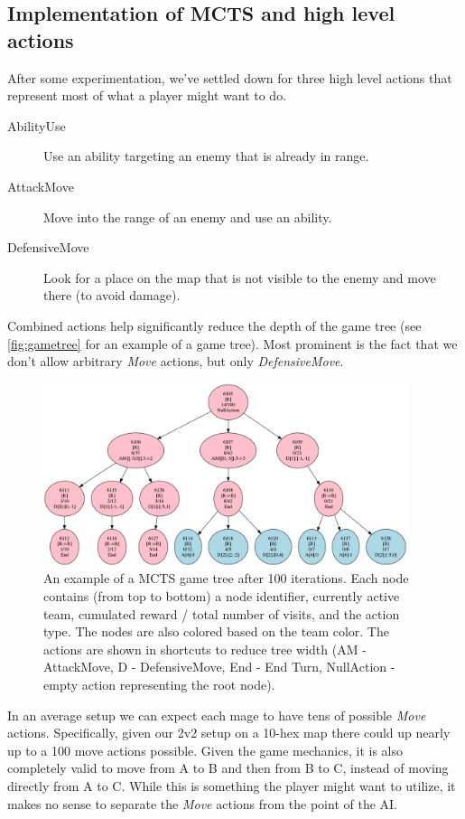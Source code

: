 \subsection{Implementation of MCTS and high level actions}

After some experimentation, we've settled down for three high level actions
that represent most of what a player might want to do.

\begin{description}
\item [AbilityUse] Use an ability targeting an enemy that is already in range.
\item [AttackMove] Move into the range of an enemy and use an ability.
\item [DefensiveMove] Look for a place on the map that is not visible to the enemy and move there (to avoid damage).
\end{description}

Combined actions help significantly reduce the depth of the game tree (see \autoref{fig:gametree} for an example of a game tree). Most
prominent is the fact that we don't allow arbitrary \emph{Move} actions, but
only \emph{DefensiveMove}.

\begin{figure}
	\centering
	\includegraphics[width=0.95\textwidth]{img/game-tree.png}
	\caption{An example of a MCTS game tree after 100 iterations. Each node
contains (from top to bottom) a node identifier, currently active team,
cumulated reward / total number of visits, and the action type. The nodes are
also colored based on the team color. The actions are shown in shortcuts to
reduce tree width (AM - AttackMove, D - DefensiveMove, End - End Turn,
NullAction - empty action representing the root node).}\label{fig:gametree}
\end{figure}

In an average setup we can expect each mage to have tens of possible
\emph{Move} actions. Specifically, given our 2v2 setup on a 10-hex map there
could up nearly up to a 100 move actions possible. Given the game mechanics, it
is also completely valid to move from A to B and then from B to C, instead of
moving directly from A to C. While this is something the player might want to
utilize, it makes no sense to separate the \emph{Move} actions from the point
of the AI\@.

